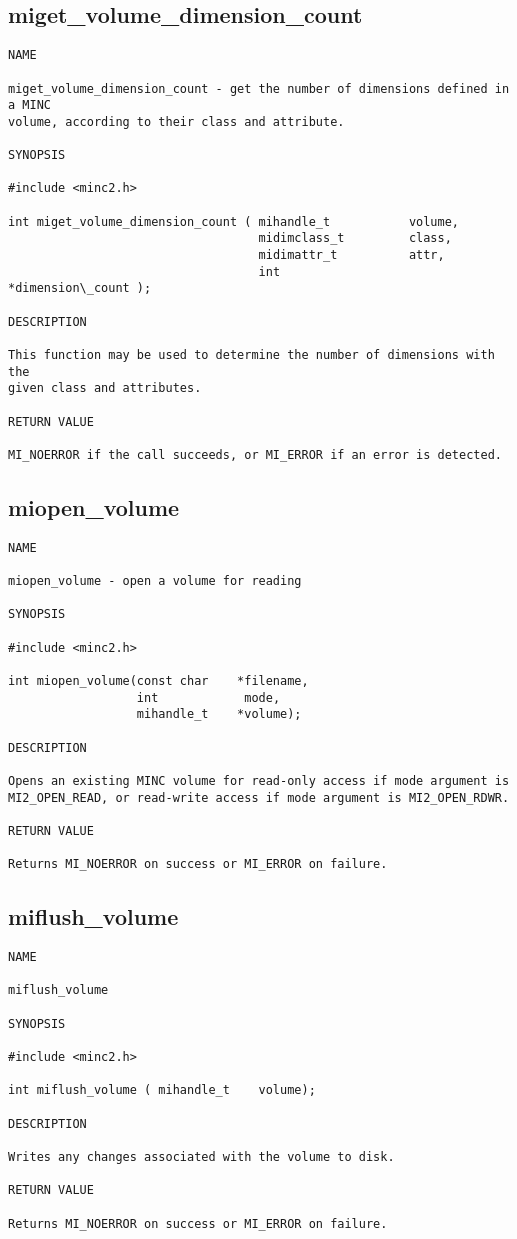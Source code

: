 \documentclass{article}
\begin{document}
\subsection{miget\_volume\_dimension\_count}
\begin{verbatim}
NAME

miget_volume_dimension_count - get the number of dimensions defined in a MINC
volume, according to their class and attribute.

SYNOPSIS

#include <minc2.h>

int miget_volume_dimension_count ( mihandle_t           volume, 
                                   midimclass_t         class,
                                   midimattr_t          attr,
                                   int                  *dimension\_count );

DESCRIPTION

This function may be used to determine the number of dimensions with the
given class and attributes.

RETURN VALUE

MI_NOERROR if the call succeeds, or MI_ERROR if an error is detected.
\end{verbatim}

\subsection{miopen\_volume}
\begin{verbatim}
NAME

miopen_volume - open a volume for reading

SYNOPSIS

#include <minc2.h>

int miopen_volume(const char    *filename, 
                  int            mode,
                  mihandle_t    *volume);

DESCRIPTION

Opens an existing MINC volume for read-only access if mode argument is
MI2_OPEN_READ, or read-write access if mode argument is MI2_OPEN_RDWR.

RETURN VALUE

Returns MI_NOERROR on success or MI_ERROR on failure.
\end{verbatim}

\subsection{miflush\_volume}
\begin{verbatim}
NAME

miflush_volume 

SYNOPSIS

#include <minc2.h>

int miflush_volume ( mihandle_t    volume);

DESCRIPTION

Writes any changes associated with the volume to disk.

RETURN VALUE

Returns MI_NOERROR on success or MI_ERROR on failure.
\end{verbatim}
\end{document}
